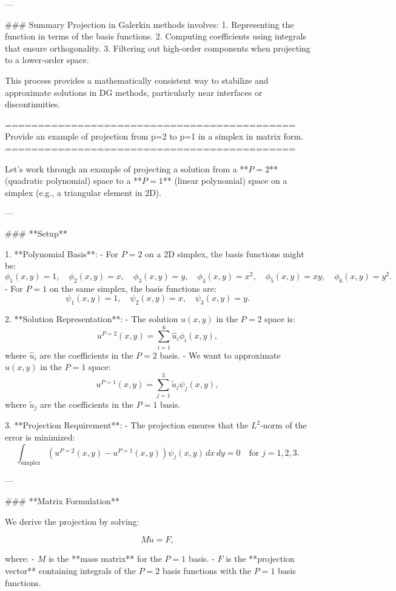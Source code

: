 ---

### Summary
Projection in Galerkin methods involves:
1. Representing the function in terms of the basis functions.
2. Computing coefficients using integrals that ensure orthogonality.
3. Filtering out high-order components when projecting to a lower-order space.

This process provides a mathematically consistent way to stabilize and approximate solutions in DG methods, particularly near interfaces or discontinuities.

============================================
Provide an example of projection from p=2 to p=1 in a simplex in matrix form.
============================================

Let's work through an example of projecting a solution from a **\( P=2 \)** (quadratic polynomial) space to a **\( P=1 \)** (linear polynomial) space on a simplex (e.g., a triangular element in 2D).

---

### **Setup**

1. **Polynomial Basis**:
   - For \( P=2 \) on a 2D simplex, the basis functions might be:
     \[
     \phi_1(x, y) = 1, \quad \phi_2(x, y) = x, \quad \phi_3(x, y) = y, \quad \phi_4(x, y) = x^2, \quad \phi_5(x, y) = xy, \quad \phi_6(x, y) = y^2.
     \]
   - For \( P=1 \) on the same simplex, the basis functions are:
     \[
     \psi_1(x, y) = 1, \quad \psi_2(x, y) = x, \quad \psi_3(x, y) = y.
     \]

2. **Solution Representation**:
   - The solution \( u(x, y) \) in the \( P=2 \) space is:
     \[
     u^{P=2}(x, y) = \sum_{i=1}^6 \hat{u}_i \phi_i(x, y),
     \]
     where \(\hat{u}_i\) are the coefficients in the \( P=2 \) basis.
   - We want to approximate \( u(x, y) \) in the \( P=1 \) space:
     \[
     u^{P=1}(x, y) = \sum_{j=1}^3 \tilde{u}_j \psi_j(x, y),
     \]
     where \(\tilde{u}_j\) are the coefficients in the \( P=1 \) basis.

3. **Projection Requirement**:
   - The projection ensures that the \( L^2 \)-norm of the error is minimized:
     \[
     \int_\text{simplex} \left( u^{P=2}(x, y) - u^{P=1}(x, y) \right) \psi_j(x, y) \, dx\,dy = 0 \quad \text{for } j = 1, 2, 3.
     \]

---

### **Matrix Formulation**

We derive the projection by solving:

\[
M \tilde{u} = F,
\]

where:
- \( M \) is the **mass matrix** for the \( P=1 \) basis.
- \( F \) is the **projection vector** containing integrals of the \( P=2 \) basis functions with the \( P=1 \) basis functions.

